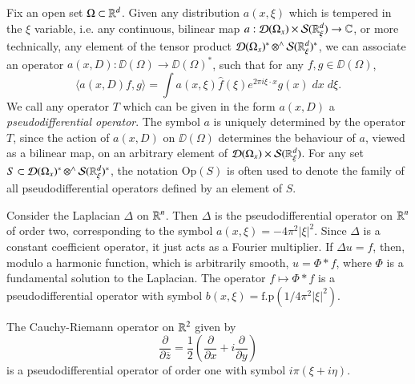 Fix an open set $\Omega \subset \operatorname{\mathbb{R}}^d$. Given any distribution $a(x,\xi)$ which is tempered in the $\xi$ variable, i.e. any continuous, bilinear map $a: \operatorname{\mathcal{D}}(\Omega_x) \times \mathcal{S}(\operatorname{\mathbb{R}}^d_\xi) \to \operatorname{\mathbb{C}}$, or more technically, any element of the tensor product $\operatorname{\mathcal{D}}(\Omega_x)^* \operatorname{{{\otimes}^\wedge}} \operatorname{\mathcal{S}}(\operatorname{\mathbb{R}}^d_\xi)^*$, we can associate an operator $a(x,D): \DD(\Omega) \to \DD(\Omega)^*$, such that for any $f,g \in \DD(\Omega)$,
%
\[ \langle a(x,D) f, g \rangle = \int a(x,\xi) \widehat{f}(\xi) e^{2 \pi i \xi \cdot x} g(x)\; dx\; d\xi. \]
%
We call any operator $T$ which can be given in the form $a(x,D)$ a \emph{pseudodifferential operator}. The symbol $a$ is uniquely determined by the operator $T$, since the action of $a(x,D)$ on $\DD(\Omega)$ determines the behaviour of $a$, viewed as a bilinear map, on an arbitrary element of $\operatorname{\mathcal{D}}(\Omega_x) \times \operatorname{\mathcal{S}}(\operatorname{\mathbb{R}}^d_\xi)$. For any set $S \subset \operatorname{\mathcal{D}}(\Omega_x)^* \operatorname{{{\otimes}^\wedge}} \operatorname{\mathcal{S}}(\operatorname{\mathbb{R}}^d_\xi)^*$, the notation $\text{Op}(S)$ is often used to denote the family of all pseudodifferential operators defined by an element of $S$.

\begin{example}
    Consider the Laplacian $\Delta$ on $\operatorname{\mathbb{R}}^n$. Then $\Delta$ is the pseudodifferential operator on $\operatorname{\mathbb{R}}^n$ of order two, corresponding to the symbol $a(x,\xi) = - 4\pi^2 |\xi|^2$. Since $\Delta$ is a constant coefficient operator, it just acts as a Fourier multiplier. If $\Delta u = f$, then, modulo a harmonic function, which is arbitrarily smooth, $u = \Phi * f$, where $\Phi$ is a fundamental solution to the Laplacian. The operator $f \mapsto \Phi * f$ is a pseudodifferential operator with symbol $b(x,\xi) = \text{f.p}(1/4\pi^2 |\xi|^2)$. 
\end{example}

\begin{example}
    The Cauchy-Riemann operator on $\operatorname{\mathbb{R}}^2$ given by
    \[ \frac{\partial}{\partial \overline{z}} = \frac{1}{2} \left( \frac{\partial}{\partial x} + i \frac{\partial}{\partial y} \right) \]
    is a pseudodifferential operator of order one with symbol $i \pi(\xi + i \eta)$.
\end{example}

